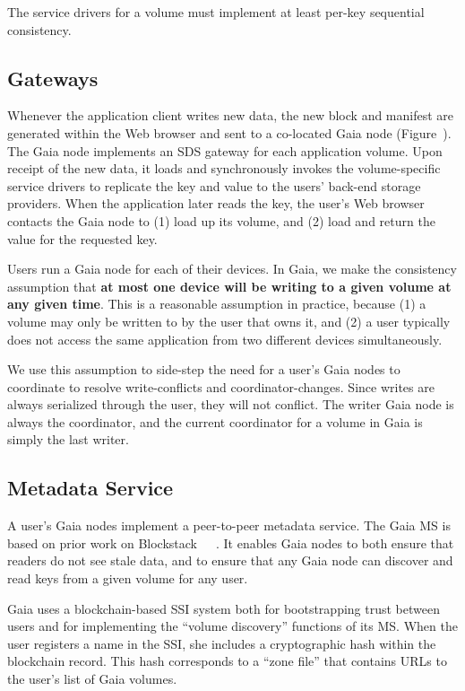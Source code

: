 The service drivers for a volume must implement at least per-key sequential
consistency.

\subsection{Gateways}


Whenever the application client writes new data, the new block and manifest are
generated within the Web browser and sent to a co-located Gaia node
(Figure~).  The Gaia node implements an SDS gateway for
each application volume.  Upon receipt of the new data, it loads and
synchronously invokes the volume-specific service drivers to replicate the key
and value to the users' back-end storage providers.  When the application later
reads the key, the user's Web browser contacts the Gaia node to (1) load up its
volume, and (2) load and return the value for the requested key.

Users run a Gaia node for each of their devices.
In Gaia, we make the consistency assumption that \textbf{at most one device will
be writing to a given volume at any given time}.  This is a reasonable
assumption in practice, because (1) a volume may only be written to by the user
that owns it, and (2) a user typically does not access the same application from
two different devices simultaneously.

We use this assumption to side-step the need for a user's Gaia nodes to
coordinate to resolve write-conflicts and coordinator-changes.  Since writes are
always serialized through the user, they will not conflict.  The writer Gaia
node is always the coordinator, and the current coordinator for a volume in Gaia
is simply the last writer.

\subsection{Metadata Service}

A user's Gaia nodes
implement a peer-to-peer metadata service.  The Gaia MS is based on prior work
on Blockstack~\cite{blockstack}~\cite{virtualchain}~\cite{ali2017}.  It enables
Gaia nodes to both ensure that readers do not see stale data, and to ensure that
any Gaia node can discover and read keys from a given volume for any user.

Gaia uses a blockchain-based SSI system both for bootstrapping trust between
users and for implementing the ``volume discovery'' functions of its MS.  When the
user registers a name in the SSI, she includes a cryptographic hash within the
blockchain record.  This hash corresponds to a ``zone file'' that
contains URLs to the user's list of Gaia volumes.

